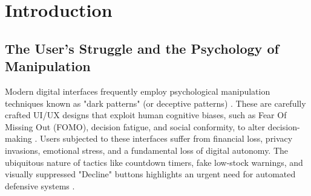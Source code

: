 \documentclass[12pt,a4paper]{article}
\begin{document}
\begin{abstract}
\noindent Dark patterns are deceptive user interface (UI) tactics engineered to subconsciously manipulate users into making decisions contrary to their best interests, such as unintended purchases or privacy concessions \cite{mathur2019, luguri}. As e-commerce platforms increasingly exploit cognitive biases and decision fatigue, pure awareness is insufficient to protect users \cite{potel}. In this project, we propose \textbf{DarkSight}, a novel, real-time browser extension that not only automatically detects dark patterns but actively mitigates them through live UI countermeasures \cite{schaefer2024}. By synthesizing landmark academic frameworks \cite{dpsentinel2024}, DarkSight employs a hybrid architecture comprising a zero-latency heuristic scanner, a local DeepSeek-R1 Large Language Model (LLM) for semantic textual analysis \cite{schaefer2023, incontext2023}, AidUI CSS structural mathematics for false hierarchy detection \cite{aidui2023}, and a Qwen2.5-VL multimodal vision model for spatial deception \cite{50shades, kocyigit2025}. Furthermore, DarkSight integrates dynamic countermeasures (Highlight, Hide, and Switch) to neutralize detected patterns in real time. Empirical evaluations demonstrate significant efficacy, achieving a 70.07\% detection accuracy on 1,818 textual instances and an 80.73\% detection accuracy on 602 visual instances. User evaluations confirm an 86\% overall satisfaction rate in restoring browsing autonomy.
\end{abstract}
\newpage

\tableofcontents
\newpage

\section{Introduction}

\subsection{The User's Struggle and the Psychology of Manipulation}
Modern digital interfaces frequently employ psychological manipulation techniques known as "dark patterns" (or deceptive patterns) \cite{mathur2019}. These are carefully crafted UI/UX designs that exploit human cognitive biases, such as Fear Of Missing Out (FOMO), decision fatigue, and social conformity, to alter decision-making \cite{luguri}. Users subjected to these interfaces suffer from financial loss, privacy invasions, emotional stress, and a fundamental loss of digital autonomy. The ubiquitous nature of tactics like countdown timers, fake low-stock warnings, and visually suppressed "Decline" buttons highlights an urgent need for automated defensive systems \cite{bajaj2025}.
\end{document}
